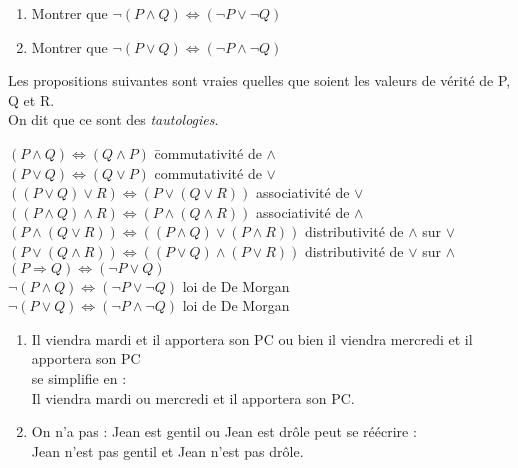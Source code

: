 \documentclass[a4paper,12pt,french]{book}
\begin{document}
\begin{exercice}
	
	\begin{enumerate}[\bfseries 1.]
		\item 	Montrer que $\neg (P\wedge Q)\Leftrightarrow (\neg P \vee \neg Q)$
		\item 	Montrer que $\neg (P\vee Q)\Leftrightarrow (\neg P \wedge \neg Q)$
	\end{enumerate}
\end{exercice}

\begin{propriete}
	Les propositions suivantes sont vraies quelles que soient les valeurs de vérité de P, Q et R.\\
	On dit que ce sont des \textit{tautologies}.
	
	\begin{tabbing}
$(P\wedge Q) \Leftrightarrow(Q\wedge P)$ 		\hspace{4cm}	\=commutativité de $\wedge$ \\ 
$(P\vee Q) \Leftrightarrow(Q\vee P)$ 						 	\>commutativité de $\vee$ \\ 
$((P\vee Q)\vee R) \Leftrightarrow(P\vee(Q\vee R))$ 			\>associativité de $\vee$ \\ 
$((P\wedge Q)\wedge R) \Leftrightarrow(P\wedge(Q\wedge R))$ 	\>associativité de $\wedge$ \\ 
$(P\wedge (Q\vee R))\Leftrightarrow((P\wedge Q)\vee(P\wedge R))$ \>distributivité de $\wedge$ sur $\vee$\\ 
$(P\vee (Q\wedge R))\Leftrightarrow((P\vee Q)\wedge(P\vee R))$ \>distributivité de $\vee$ sur $\wedge$\\ 
$(P\Rightarrow Q)\Leftrightarrow(\neg P \vee Q)$\\
$\neg (P\wedge Q)\Leftrightarrow (\neg P \vee \neg Q)$ \> loi de De Morgan\\
$\neg (P\vee Q)\Leftrightarrow (\neg P \wedge \neg Q)$ \> loi de De Morgan\\
	\end{tabbing}
\end{propriete}

\begin{exemple}
	
\begin{enumerate}[\textbullet]
	\item 	\og Il viendra mardi et il apportera son PC ou bien il viendra mercredi et il apportera son PC\fg{}\\
	se simplifie en :\\	\og Il viendra mardi ou mercredi et il apportera son PC\fg{}.
	\item 	\og On n'a pas :  Jean est gentil ou Jean est drôle\fg{} peut se réécrire :\\
			\og Jean n'est pas gentil et Jean n'est pas drôle\fg{}.	
\end{enumerate}
\end{exemple}
\end{document}
